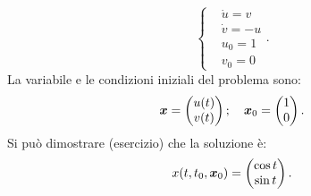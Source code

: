 \begin{exmp}
    \[
        \begin{cases}
	    & \dot{u} = v\\
	    & \dot{v} = -u\\
	    & u_0 = 1\\
	    & v_0 = 0
        \end{cases}
    .\] 
    La variabile e le condizioni iniziali del problema sono:
    \[
	\boldsymbol{x}  = \begin{pmatrix} u(t)\\ v(t) \end{pmatrix} ; \quad \boldsymbol{x}_0 = \begin{pmatrix} 1 \\ 0 \end{pmatrix} 
    .\] 
    Si può dimostrare (\textcolor{mygreen}{esercizio}) che la soluzione è:
    \[
	x(t, t_0, \boldsymbol{x}_0) = \begin{pmatrix} \cos t \\ \sin t \end{pmatrix} 
    .\] 
\end{exmp}
\noindent

